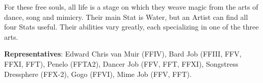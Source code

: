 \begin{jobdesc}[name=pjob-artist]
  For these free souls, all life is a stage on which they weave magic from the arts of dance, song and mimicry. Their main Stat is Water, but an Artist can find all four Stats useful. Their abilities vary greatly, each specializing in one of the three arts.\pc%

  \textbf{Representatives}: Edward Chris van Muir (FFIV), Bard Job (FFIII, FFV, FFXI, FFT), Penelo (FFTA2), Dancer Job (FFV, FFT, FFXI), Songstress Dressphere (FFX-2), Gogo (FFVI), Mime Job (FFV, FFT).\pc%

  \jobstats[hpa=4x,hpb=5x,hpc=6x,hpd=7x,mpa=0x,mpb=1x,mpc=2x,armor=Medium,
    weapons=Claws / Gloves \\ Light Swords / Knives \\ Instruments \\ Throwing Weapons]

\end{jobdesc}

